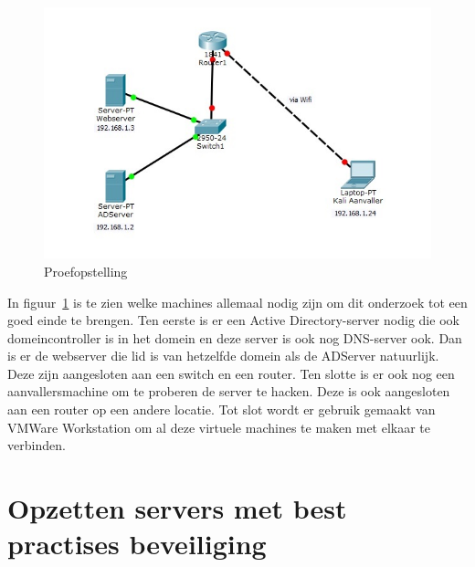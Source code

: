 \documentclass[pdftex,a4paper,12pt]{report}
\begin{document}
\begin{figure}[H]
\begin{center}
\includegraphics{img/Situatie}
\end{center}
\caption{Proefopstelling}
\label{img:situatie}
\end{figure}

In figuur~\ref{img:situatie} is te zien welke machines allemaal nodig zijn om dit onderzoek tot een goed einde te brengen. Ten eerste is er een Active Directory-server nodig die ook domeincontroller is in het domein en deze server is ook nog DNS-server ook. Dan is er de webserver die lid is van hetzelfde domein als de ADServer natuurlijk. Deze zijn aangesloten aan een switch en een router. Ten slotte is er ook nog een aanvallersmachine om te proberen de server te hacken. Deze is ook aangesloten aan een router op een andere locatie. Tot slot wordt er gebruik gemaakt van VMWare Workstation om al deze virtuele machines te maken met elkaar te verbinden.

\chapter{Opzetten servers met best practises beveiliging}
\end{document}
